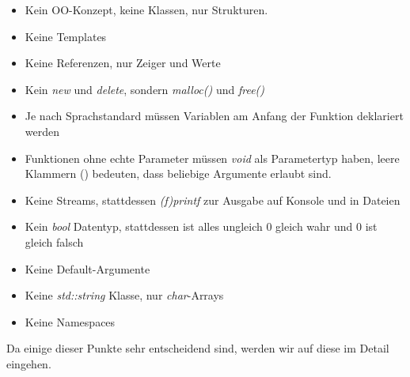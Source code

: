 \documentclass[
  accentcolor=tud1c,	%
  colorbacktitle,		%
  inverttitle,			%
  german,				%
  twoside
]{tudexercise}
\begin{document}
\begin{itemize}
\item Kein OO-Konzept, keine Klassen, nur Strukturen.
\item Keine Templates
\item Keine Referenzen, nur Zeiger und Werte
\item Kein \emph{new} und \emph{delete}, sondern \emph{malloc()} und \emph{free()}
\item Je nach Sprachstandard müssen Variablen am Anfang der Funktion deklariert werden
\item Funktionen ohne echte Parameter müssen \emph{void} als Parametertyp haben, leere Klammern () bedeuten, dass beliebige Argumente erlaubt sind.
\item Keine Streams, stattdessen \emph{(f)printf} zur Ausgabe auf Konsole und in Dateien
\item Kein \emph{bool} Datentyp, stattdessen ist alles ungleich 0 gleich wahr und 0 ist gleich falsch
\item Keine Default-Argumente
\item Keine \emph{std::string} Klasse, nur \emph{char}-Arrays
\item Keine Namespaces
\end{itemize}

Da einige dieser Punkte sehr entscheidend sind, werden wir auf diese im Detail eingehen.
\end{document}
